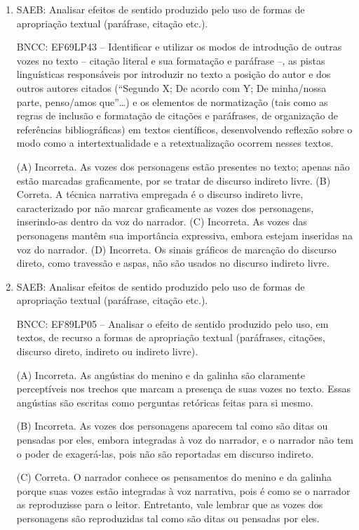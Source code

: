 \begin{enumerate}
	\item

SAEB: Analisar efeitos de sentido produzido pelo uso de formas de
apropriação textual (paráfrase, citação etc.). 

BNCC: EF69LP43 --
Identificar e utilizar os modos de introdução de outras vozes no texto
-- citação literal e sua formatação e paráfrase --, as pistas
linguísticas responsáveis por introduzir no texto a posição do autor e
dos outros autores citados (``Segundo X; De acordo com Y; De minha/nossa
parte, penso/amos que''\ldots) e os elementos de normatização (tais como
as regras de inclusão e formatação de citações e paráfrases, de
organização de referências bibliográficas) em textos científicos,
desenvolvendo reflexão sobre o modo como a intertextualidade e a
retextualização ocorrem nesses textos.

(A) Incorreta. As vozes dos personagens estão presentes no texto; apenas
não estão marcadas graficamente, por se tratar de discurso indireto
livre. 
(B) Correta. A técnica narrativa empregada é o discurso indireto
livre, caracterizado por não marcar graficamente as vozes dos
personagens, inserindo-as dentro da voz do narrador. 
(C) Incorreta. As
vozes das personagens mantêm sua importância expressiva, embora estejam
inseridas na voz do narrador. 
(D) Incorreta. Os sinais gráficos de
marcação do discurso direto, como travessão e aspas, não são usados no
discurso indireto livre.

\item

SAEB: Analisar efeitos de sentido produzido pelo uso de formas de
apropriação textual (paráfrase, citação etc.). 

BNCC: EF89LP05 --
Analisar o efeito de sentido produzido pelo uso, em textos, de recurso a
formas de apropriação textual (paráfrases, citações, discurso direto,
indireto ou indireto livre).

(A) Incorreta. As angústias do menino e da galinha são claramente
perceptíveis nos trechos que marcam a presença de suas vozes no texto.
Essas angústias são escritas como perguntas retóricas feitas para si
mesmo.

(B) Incorreta. As vozes dos personagens aparecem tal como são ditas ou
pensadas por eles, embora integradas à voz do narrador, e o narrador não
tem o poder de exagerá-las, pois não são reportadas em discurso
indireto.

(C) Correta. O narrador conhece os pensamentos do menino e da galinha
porque suas vozes estão integradas à voz narrativa, pois é como se o
narrador as reproduzisse para o leitor. Entretanto, vale lembrar que as
vozes dos personagens são reproduzidas tal como são ditas ou pensadas
por eles.


\end{enumerate}

